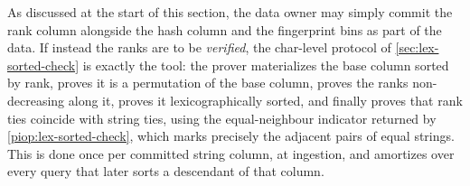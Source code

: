 As discussed at the start of this section, the data owner may simply commit the rank column alongside the hash column and the fingerprint bins as part of the data. If instead the ranks are to be \emph{verified}, the char-level protocol of \cref{sec:lex-sorted-check} is exactly the tool: the prover materializes the base column sorted by rank, proves it is a permutation of the base column, proves the ranks non-decreasing along it, proves it lexicographically sorted, and finally proves that rank ties coincide with string ties, using the equal-neighbour indicator returned by \cref{piop:lex-sorted-check}, which marks precisely the adjacent pairs of equal strings. This is done once per committed string column, at ingestion, and amortizes over every query that later sorts a descendant of that column.

